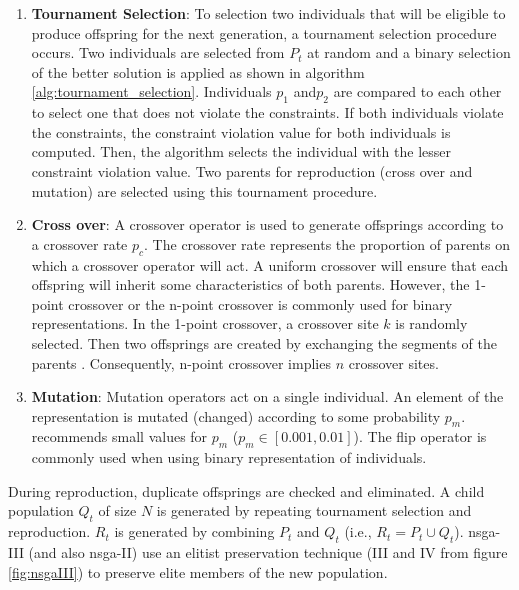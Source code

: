 \begin{enumerate}
    \item \textbf{Tournament Selection}: To selection two individuals that will be eligible to produce offspring for the next generation, a tournament selection procedure occurs. Two individuals are selected from $P_t$ at random and a binary selection of the better solution is applied as shown in algorithm \ref{alg:tournament_selection}. Individuals $p_1$ and$p_2$ are compared to each other to select one that does not violate the constraints. If both individuals violate the constraints, the constraint violation value for both individuals is computed. Then, the algorithm selects the individual with the lesser constraint violation value. Two parents for reproduction (cross over and mutation) are selected using this tournament procedure.
    \item \textbf{Cross over}: A crossover operator is used to generate offsprings according to a crossover rate $p_c$. The crossover rate represents the proportion of parents on which a crossover operator will act. A uniform crossover will ensure that each offspring will inherit some characteristics of both parents. However, the 1-point crossover or the n-point crossover is commonly used for binary representations. In the 1-point crossover, a crossover site $k$ is randomly selected. Then two offsprings are created by exchanging the segments of the parents \parencite{Talbi2009Metaheuristics:Implementation}. Consequently, n-point crossover implies $n$ crossover sites. 
    \item \textbf{Mutation}: Mutation operators act on a single individual. An element of the representation is mutated (changed) according to some probability $p_m$. \parencite{Talbi2009Metaheuristics:Implementation} recommends small values for $p_m$ ($p_m \in [0.001, 0.01]$). The flip operator is commonly used when using binary representation of individuals. %
    
\end{enumerate}
During reproduction, duplicate offsprings are checked and eliminated. A child population $Q_t$ of size $N$ is generated by repeating tournament selection and reproduction. $R_t$ is generated by combining $P_t$ and $Q_t$ (i.e., $R_t = P_t \cup Q_t$). \Gls{nsga}-III (and also \gls{nsga}-II) use an elitist preservation technique (III and IV from figure \ref{fig:nsgaIII}) to preserve elite members of the new population. 

